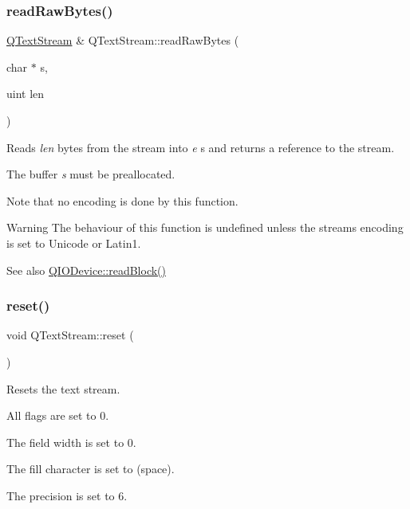 \subsubsection{\texorpdfstring{readRawBytes()}{readRawBytes()}}
{\footnotesize\ttfamily \mbox{\hyperlink{class_q_text_stream}{Q\+Text\+Stream}} \& Q\+Text\+Stream\+::read\+Raw\+Bytes (\begin{DoxyParamCaption}\item[{char $\ast$}]{s,  }\item[{uint}]{len }\end{DoxyParamCaption})}

Reads {\itshape len} bytes from the stream into {\itshape e} s and returns a reference to the stream.

The buffer {\itshape s} must be preallocated.

Note that no encoding is done by this function.

\begin{DoxyWarning}{Warning}
The behaviour of this function is undefined unless the stream\textquotesingle{}s encoding is set to Unicode or Latin1.
\end{DoxyWarning}
\begin{DoxySeeAlso}{See also}
\mbox{\hyperlink{class_q_i_o_device_a71f10647e4bd98141f45362b9a06983a}{Q\+I\+O\+Device\+::read\+Block()}} 
\end{DoxySeeAlso}
\mbox{\label{class_q_text_stream_ac92d855fc3fa8b5d1c7421e2a0654a83}} 
\subsubsection{\texorpdfstring{reset()}{reset()}}
{\footnotesize\ttfamily void Q\+Text\+Stream\+::reset (\begin{DoxyParamCaption}{ }\end{DoxyParamCaption})}

Resets the text stream.


\begin{DoxyItemize}
\item All flags are set to 0. 
\item The field width is set to 0. 
\item The fill character is set to \textquotesingle{} \textquotesingle{} (space). 
\item The precision is set to 6. 
\end{DoxyItemize}

